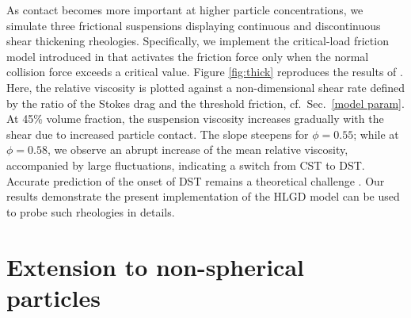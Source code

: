 As contact becomes more important at higher particle concentrations, we simulate three frictional suspensions displaying continuous and discontinuous shear thickening rheologies. Specifically, we implement the critical-load friction model introduced in \cite{Mari_Seto_2014JoR} that activates the friction force only when the normal collision force exceeds a critical value. Figure \ref{fig:thick} reproduces the results of \cite{Mari_Seto_2014JoR}. Here, the relative viscosity is plotted against a non-dimensional shear rate defined by the ratio of the Stokes drag and the threshold friction, cf.\ Sec.\ \ref{model param}. At 45\% volume fraction, the suspension viscosity increases gradually with the shear due to increased particle contact. The slope steepens for $\phi=0.55$; while at $\phi=0.58$, we observe an abrupt increase of the mean relative viscosity, accompanied by large fluctuations, indicating a switch from CST to DST. Accurate prediction of the onset of DST remains a theoretical challenge \citep{Morris_annurev2020}. Our results demonstrate the present implementation of the HLGD model can be used to probe such rheologies in details.





\section{Extension to non-spherical particles}
\label{sec:nonsph}

